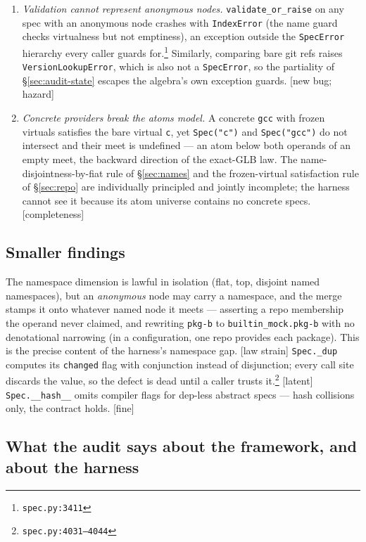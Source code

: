 \documentclass[11pt]{article}
\theoremstyle{definition}
\theoremstyle{remark}
\newcommand{\code}[1]{\texttt{#1}}
\newcommand{\src}[1]{\footnote{\code{#1}}}
\begin{document}
\begin{enumerate}[itemsep=3pt]
{vs 3859--3861}  [latent law violation]
\item \emph{Validation cannot represent anonymous nodes.}
\code{validate\_or\_raise} on any spec with an anonymous node crashes with
\code{IndexError} (the name guard checks virtualness but not emptiness), an
exception outside the \code{SpecError} hierarchy every caller guards
for.\src{spec.py:3411}  Similarly, comparing bare git refs raises
\code{VersionLookupError}, which is also not a \code{SpecError}, so the
partiality of \S\ref{sec:audit-state} escapes the algebra's own exception
guards.  [new bug; hazard]
\item \emph{Concrete providers break the atoms model.}  A concrete
\code{gcc} with frozen virtuals satisfies the bare virtual \code{c}, yet
\code{Spec("c")} and \code{Spec("gcc")} do not intersect and their meet is
undefined --- an atom below both operands of an empty meet, the backward
direction of the exact-GLB law.  The name-disjointness-by-fiat rule of
\S\ref{sec:names} and the frozen-virtual satisfaction rule of
\S\ref{sec:repo} are individually principled and jointly incomplete; the
harness cannot see it because its atom universe contains no concrete specs.
[completeness]
\end{enumerate}

\subsection{Smaller findings}

The namespace dimension is lawful in isolation (flat, top, disjoint named
namespaces), but an \emph{anonymous} node may carry a namespace, and the
merge stamps it onto whatever named node it meets --- asserting a repo
membership the operand never claimed, and rewriting \code{pkg-b} to
\code{builtin\_mock.pkg-b} with no denotational narrowing (in a
configuration, one repo provides each package).  This is the precise content
of the harness's namespace gap.  [law strain]  \code{Spec.\_dup} computes its
\code{changed} flag with conjunction instead of disjunction; every call site
discards the value, so the defect is dead until a caller trusts
it.\src{spec.py:4031--4044}  [latent]  \code{Spec.\_\_hash\_\_} omits
compiler flags for dep-less abstract specs --- hash collisions only, the
contract holds.  [fine]

\subsection{What the audit says about the framework, and about the harness}
\end{document}
